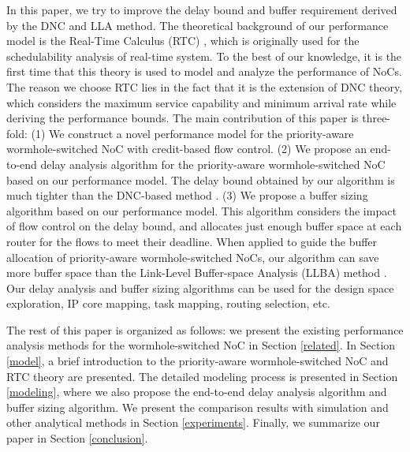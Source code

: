 \documentclass[preprint]{elsarticle}
\begin{document}
In this paper, we try to improve the delay bound and buffer requirement derived by the DNC \cite{Qian489900} and LLA \cite{73,189} method. The theoretical background of our performance model is the Real-Time Calculus (RTC) \cite{1253607}, which is originally used for the schedulability analysis of real-time system. To the best of our knowledge, it is the first time that this theory is used to model and analyze the performance of NoCs. The reason we choose RTC lies in the fact that it is the extension of DNC theory, which considers the maximum service capability and minimum arrival rate while deriving the performance bounds. The main contribution of this paper is three-fold: (1) We construct a novel performance model for the priority-aware wormhole-switched NoC with credit-based flow control. (2) We propose an end-to-end delay analysis algorithm for the priority-aware wormhole-switched NoC based on our performance model. The delay bound obtained by our algorithm is much tighter than the DNC-based method \cite{Qian489900}. (3) We propose a buffer sizing algorithm based on our performance model. This algorithm considers the impact of flow control on the delay bound, and allocates just enough buffer space at each router for the flows to meet their deadline. When applied to guide the buffer allocation of priority-aware wormhole-switched NoCs, our algorithm can save more buffer space than the Link-Level Buffer-space Analysis (LLBA) method \cite{189}. Our delay analysis and buffer sizing algorithms can be used for the design space exploration, IP core mapping, task mapping, routing selection, etc.

The rest of this paper is organized as follows: we present the existing performance analysis methods for the wormhole-switched NoC in Section \ref{related}. In Section \ref{model}, a brief introduction to the priority-aware wormhole-switched NoC and RTC theory are presented. The detailed modeling process is presented in Section \ref{modeling}, where we also propose the end-to-end delay analysis algorithm and buffer sizing algorithm. We present the comparison results with simulation and other analytical methods in Section \ref{experiments}. Finally, we summarize our paper in Section \ref{conclusion}.
\end{document}
